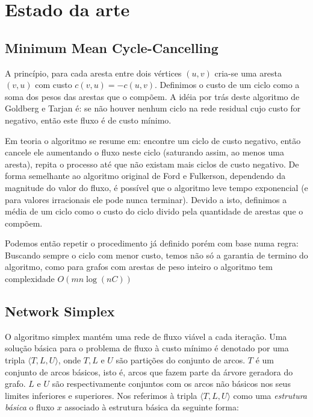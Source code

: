 \documentclass[12pt,a4]{article}
\begin{document}
\section{Estado da arte}
\label{sec:state-of-the-art}

\subsection{Minimum Mean Cycle-Cancelling}
\label{subsec:min-mean-cycle-cancelling}

A princípio, para cada aresta entre dois vértices $(u,v)$ cria-se uma aresta
$(v,u)$ com custo $c(v,u) = -c(u,v)$. Definimos o custo de um ciclo como a soma
dos pesos das arestas que o compõem. A idéia por trás deste algoritmo de
Goldberg e Tarjan é: se não houver nenhum ciclo na rede residual cujo custo for
negativo, então este fluxo é de custo mínimo.

Em teoria o algoritmo se resume em: encontre um ciclo de custo negativo, então
cancele ele aumentando o fluxo neste ciclo (saturando assim, ao menos uma
aresta), repita o processo até que não existam mais ciclos de custo negativo. De
forma semelhante ao algoritmo original de Ford e Fulkerson, dependendo da
magnitude do valor do fluxo, é possível que o algoritmo leve tempo exponencial
(e para valores irracionais ele pode nunca terminar). Devido a isto, definimos a
média de um ciclo como o custo do ciclo divido pela quantidade de arestas que o
compõem.

Podemos então repetir o procedimento já definido porém com base numa regra:
Buscando sempre o ciclo com menor custo, temos não só a garantia de termino do
algoritmo, como para grafos com arestas de peso inteiro o algoritmo tem
complexidade $O(mn \log(nC))$

\subsection{Network Simplex}
\label{subsec:network-simplex}

O algoritmo simplex mantém uma rede de fluxo viável a cada iteração. Uma solução
básica para o problema de fluxo à custo mínimo é denotado por uma tripla
$\langle T,L,U \rangle$, onde $T,L$ e $U$ são partições do conjunto de arcos.
$T$ é um conjunto de arcos básicos, isto é, arcos que fazem parte da árvore
geradora do grafo. $L$ e $U$ são respectivamente conjuntos com os arcos não
básicos nos seus limites inferiores e superiores. Nos referimos à tripla
$\langle T,L,U \rangle$ como uma \textit{estrutura básica} o fluxo $x$ associado
à estrutura básica da seguinte forma:
\end{document}
